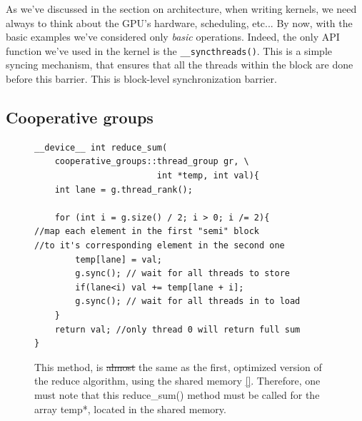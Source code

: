 \documentclass[12pt]{article}
\begin{document}
As we've discussed in the section on architecture, when writing kernels, we need always to think about the GPU's hardware, scheduling, etc...
By now, with the basic examples we've considered only \textit{basic} operations. Indeed, the only API function we've used in the kernel is the \verb|__syncthreads()|. 
This is a simple syncing mechanism, that ensures that all the threads within the block are 
done before this barrier. This is block-level synchronization barrier.

\subsection*{Cooperative groups}
\begin{figure}
\begin{minipage}[l]{0.67\textwidth}
    \vspace{-0.5cm}

\begin{verbatim}
__device__ int reduce_sum(
    cooperative_groups::thread_group gr, \
                        int *temp, int val){
    int lane = g.thread_rank();

    for (int i = g.size() / 2; i > 0; i /= 2){ 
//map each element in the first "semi" block 
//to it's corresponding element in the second one
        temp[lane] = val;
        g.sync(); // wait for all threads to store
        if(lane<i) val += temp[lane + i];
        g.sync(); // wait for all threads in to load
    }
    return val; //only thread 0 will return full sum
}
\end{verbatim}
\label{coop_group}
    \caption{This method, is \sout{almost} the same as the first, optimized version of the reduce 
    algorithm, using the shared memory \autoref{}. Therefore, one must note that this reduce_sum() method 
    must be called for the array temp*, located in the shared memory.}

\end{minipage}
\end{figure}
\end{document}
